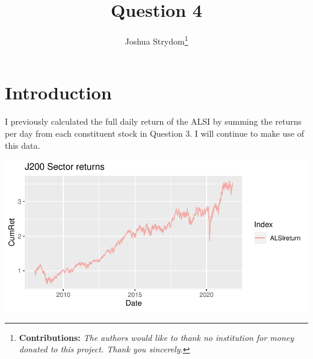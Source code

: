 \documentclass[11pt,preprint, authoryear]{elsarticle}
\let\origfigure\figure
\let\endorigfigure\endfigure
\renewenvironment{figure}[1][2] {
    \expandafter\origfigure\expandafter[H]
} {
    \endorigfigure
}
\numberwithin{equation}{section}
\numberwithin{figure}{section}
\numberwithin{table}{section}
\let\rmarkdownfootnote\footnote%
\def\footnote{\protect\rmarkdownfootnote}
\begin{document}
\begin{frontmatter}  %

\title{Question 4}





\author[Add1]{Joshua Strydom\footnote{\textbf{Contributions:}
  \newline \emph{The authors would like to thank no institution for
  money donated to this project. Thank you sincerely.}}}





\address[Add1]{Stellenbosch University, Stellenbosch, South Africa}



\vspace{1cm}





\vspace{0.5cm}

\end{frontmatter}



\pagestyle{fancy}
\chead{}
\rhead{}
\lfoot{}
\lhead{}
\cfoot{}


\headsep 35pt %




\hypertarget{introduction}{%
\section{\texorpdfstring{Introduction
\label{Introduction}}{Introduction }}\label{introduction}}

I previously calculated the full daily return of the ALSI by summing the
returns per day from each constituent stock in Question 3. I will
continue to make use of this data.

\begin{figure}[H]

{\centering \includegraphics{Question4_files/figure-latex/Figure1-1} 

}

\caption{ALSI cumulative returns \label{Figure1}}\label{fig:Figure1}
\end{figure}
\end{document}
